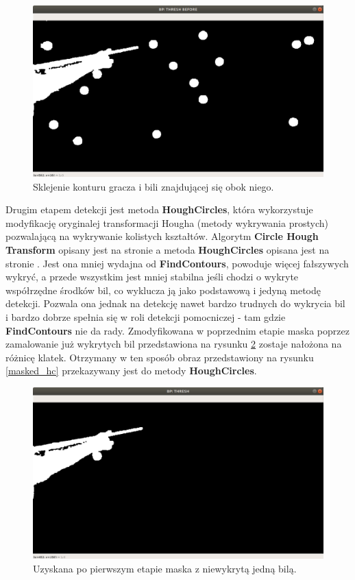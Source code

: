 \documentclass[12pt]{article}
\begin{document}
    \begin{figure}[!htb]
        \centering
        \includegraphics[width=15cm]{./images/obrazki/bp/thresh_before_hc2.png}
        \caption{Sklejenie konturu gracza i bili znajdującej się obok niego.}
        \label{thresh_before_hc}
    \end{figure}

    Drugim etapem detekcji jest metoda \textbf{HoughCircles}, która wykorzystuje modyfikację oryginalej transformacji Hougha (metody wykrywania prostych) pozwalającą na wykrywanie kolistych kształtów. Algorytm \textbf{Circle Hough Transform} opisany jest na stronie \cite{CirclesHoughTransform} a metoda \textbf{HoughCircles} opisana jest na stronie \cite{HoughCircles}. Jest ona mniej wydajna od \textbf{FindContours}, powoduje więcej fałszywych wykryć, a przede wszystkim jest mniej stabilna jeśli chodzi o wykryte współrzędne środków bil, co wyklucza ją jako podstawową i jedyną metodę detekcji. Pozwala ona jednak na detekcję nawet bardzo trudnych do wykrycia bil i bardzo dobrze spełnia się w roli detekcji pomocniczej - tam gdzie \textbf{FindContours} nie da rady. Zmodyfikowana w poprzednim etapie maska poprzez zamalowanie już wykrytych bil przedstawiona na rysunku \ref{thresh_hc} zostaje nałożona na różnicę klatek. Otrzymany w ten sposób obraz przedstawiony na rysunku \ref{masked_hc} przekazywany jest do metody \textbf{HoughCircles}.
  
    \begin{figure}[!htb]
        \centering
        \includegraphics[width=15cm]{./images/obrazki/bp/thresh_hc.png}
        \caption{Uzyskana po pierwszym etapie maska z niewykrytą jedną bilą.}
        \label{thresh_hc}
    \end{figure}
\end{document}
